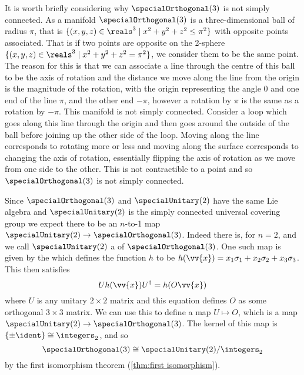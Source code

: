 It is worth briefly considering why \(\specialOrthogonal(3)\) is not simply connected.
As a manifold \(\specialOrthogonal(3)\) is a three-dimensional ball of radius \(\pi\), that is \(\{(x, y, z) \in \reals^3 \mid x^2 + y^2 + z^2 \le \pi^2\}\) with opposite points associated.
That is if two points are opposite on the 2-sphere \(\{(x, y, z) \in \reals^3 \mid x^2 + y^2 + z^2 = \pi^2\}\), we consider them to be the same point.
The reason for this is that we can associate a line through the centre of this ball to be the axis of rotation and the distance we move along the line from the origin is the magnitude of the rotation, with the origin representing the angle 0 and one end of the line \(\pi\), and the other end \(-\pi\), however a rotation by \(\pi\) is the same as a rotation by \(-\pi\).
This manifold is not simply connected.
Consider a loop which goes along this line through the origin and then goes around the outside of the ball before joining up the other side of the loop.
Moving along the line corresponds to rotating more or less and moving along the surface corresponds to changing the axis of rotation, essentially flipping the axis of rotation as we move from one side to the other.
This is not contractible to a point and so \(\specialOrthogonal(3)\) is not simply connected.

Since \(\specialOrthogonal(3)\) and \(\specialUnitary(2)\) have the same Lie algebra and \(\specialUnitary(2)\) is the simply connected universal covering group we expect there to be an \(n\)-to-1 map \(\specialUnitary(2) \to \specialOrthogonal(3)\).
Indeed there is, for \(n = 2\), and we call \(\specialUnitary(2)\) a  of \(\specialOrthogonal(3)\).
One such map is given by the  which defines the function \(h\) to be \(h(\vv{x}) = x_1\sigma_1 + x_2\sigma_2 + x_3\sigma_3\).
This then satisfies
\begin{equation}
    Uh(\vv{x})U^\hermit = h(O\vv{x})
\end{equation}
where \(U\) is any unitary \(2\times 2\) matrix and this equation defines \(O\) as some orthogonal \(3\times 3\) matrix.
We can use this to define a map \(U \mapsto O\), which is a map \(\specialUnitary(2) \to \specialOrthogonal(3)\).
The kernel of this map is \(\{\pm \ident\} \isomorphic \integers_2\), and so
\begin{equation}
    \specialOrthogonal(3) \isomorphic \specialUnitary(2) / \integers_2
\end{equation}
by the first isomorphism theorem (\cref{thm:first isomorphism}).

